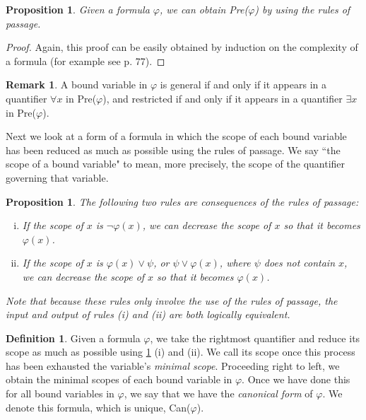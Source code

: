 \documentclass[a4paper,12pt]{report}
\newtheorem{prop}[lem]{Proposition}
\theoremstyle{definition}
\newtheorem{mydef}[lem]{Definition}
\newtheorem{remark}[lem]{Remark}
\begin{document}
\begin{prop}
Given a formula $\varphi$, we can obtain Pre($\varphi$) by using the rules of passage.
\end{prop}
\begin{proof}
Again, this proof can be easily obtained by induction on the complexity of a formula (for example see \cite{jhdiss} p. 77).
\end{proof}

\begin{remark}
\label{status quant}
A bound variable in $\varphi$ is general if and only if it appears in a quantifier $\forall x$ in Pre($\varphi$), and restricted if and only if it appears in a quantifier $\exists x$ in Pre($\varphi$).
\end{remark}

Next we look at a form of a formula in which the scope of each bound variable has been reduced as much as possible using the rules of passage. We say ``the scope of a bound variable" to mean, more precisely, the scope of the quantifier governing that variable.

\begin{prop}
\label{scope red}
The following two rules are consequences of the rules of passage:
\begin{enumerate}[(i)]
\item If the scope of $x$ is $\neg \varphi (x)$, we can decrease the scope of $x$ so that it becomes $\varphi(x)$.
\item If the scope of $x$ is $\varphi(x) \lor \psi$, or $\psi \lor \varphi(x)$, where $\psi$ does not contain $x$, we can decrease the scope of $x$ so that it becomes $\varphi(x)$.
\end{enumerate}
\noindent Note that because these rules only involve the use of the rules of passage, the input and output of rules (i) and (ii) are both logically equivalent.
\end{prop}

\begin{mydef}
\label{defcan}
Given a formula $\varphi$, we take the rightmost quantifier and reduce its scope as much as possible using \ref{scope red} (i) and (ii). We call its scope once this process has been exhausted the variable's \emph{minimal scope}. Proceeding right to left, we obtain the minimal scopes of each bound variable in $\varphi$. Once we have done this for all bound variables in $\varphi$, we say that we have the \emph{canonical form} of $\varphi$. We denote this formula, which is unique, Can($\varphi$).
\end{mydef}
\end{document}
